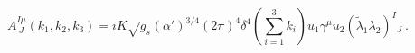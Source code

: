 \begin{equation}
A^{I \mu }_{\ J} (k_1,k_2, k_3) = i K \sqrt{g_s} (\alpha')^{3/4}
(2\pi)^4 \delta^4 (\sum_{i=1}^3 k_i) \bar u_1 \gamma^\mu u_2
\left(\tilde \lambda_{1 } \lambda_{2 }\right)^I{}_J \ .
\end{equation}

